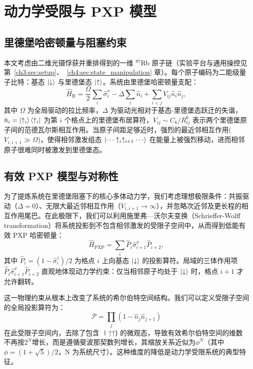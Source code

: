 \documentclass[../main.tex]{subfiles}
\begin{document}
\section{动力学受限与 PXP 模型}
\subsection{里德堡哈密顿量与阻塞约束}
本文考虑由二维光镊俘获并重排得到的一维 $^{87}$Rb 原子链（实验平台与通用操控见第~\ref{ch3:sec:setup}、~\ref{ch4:sec:state_manipulation} 章）。每个原子编码为二能级量子比特：基态 $\ket{\downarrow}$ 与里德堡态 $\ket{\uparrow}$。系统由里德堡哈密顿量支配：
\begin{equation}
\hat{H}_\text{R}=
\frac{\Omega}{2}\sum_i\hat{\sigma}^x_i-
\Delta\sum_i\hat{n}_i+
\sum_{i<j}V_{ij}\hat{n}_i\hat{n}_j,
\label{ch5:eq:rydberg_hamiltonian}
\end{equation}
其中 $\Omega$ 为全局驱动的拉比频率，$\Delta$ 为驱动光相对于基态-里德堡态跃迁的失谐，$\hat{n}_i=\ket{\uparrow_i}\bra{\uparrow_i}$ 为第 $i$ 个格点上的里德堡布居算符，$V_{ij}\sim C_6/R_{ij}^6$ 表示两个里德堡原子间的范德瓦尔斯相互作用。当原子间距足够近时，强烈的最近邻相互作用($V_{i, i+1}\gg\Omega$)，使得相邻激发组态 $\ket{\cdots\uparrow_i\uparrow_{i+1}\cdots}$ 在能量上被强烈移动，进而相邻原子很难同时被激发到里德堡态。

\subsection{有效 PXP 模型与对称性}
为了提炼系统在里德堡阻塞下的核心多体动力学，我们考虑理想极限条件：共振驱动（$\Delta=0$）、无限大最近邻相互作用（$V_{i, i+1}\rightarrow\infty$），并忽略次近邻及更长程的相互作用尾巴。在此极限下，我们可以利用施里弗—沃尔夫变换（Schrieffer-Wolff transformation）将系统投影到不包含相邻激发的受限子空间中，从而得到低能有效 PXP 哈密顿量：
\begin{equation}
\hat{H}_\text{PXP}=\sum_i \hat{P}_i\hat{\sigma}^x_{i+1}\hat{P}_{i+2},
\label{ch5:eq:pxp}
\end{equation}
其中 $\hat{P}_i=(1-\hat{\sigma}^z_i)/2$ 为格点 $i$ 上向基态 $\ket{\downarrow}$ 的投影算符。局域的三体作用项 $\hat{P}_i\hat{\sigma}^x_{i+1}\hat{P}_{i+2}$ 直观地体现动力学约束：仅当相邻原子均处于 $\ket{\downarrow}$ 时，格点 $i+1$ 才允许翻转。

这一物理约束从根本上改变了系统的希尔伯特空间结构。我们可以定义受限子空间的全局投影算符为：
\begin{equation}
\mathcal{P}=\prod_j\left(1-\hat{n}_j\hat{n}_{j+1}\right)
\label{ch5:eq:projector}
\end{equation}
在此受限子空间内，去除了包含 ∣↑↑⟩ 的微观态，导致有效希尔伯特空间的维数不再按$2^N$增长，而是遵循斐波那契数列增长，其缩放关系近似为$\phi^N$（其中 $\phi=(1+\sqrt{5})/2$，N 为系统尺寸）。这种维度的降低是动力学受限系统的典型特征。
\end{document}
